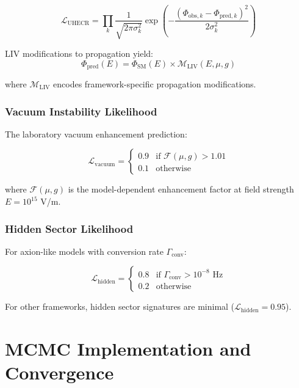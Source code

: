 \documentclass[12pt]{article}
\begin{document}
\begin{equation}
\mathcal{L}_{\text{UHECR}} = \prod_k \frac{1}{\sqrt{2\pi\sigma_k^2}} \exp\left(-\frac{(\Phi_{\text{obs},k} - \Phi_{\text{pred},k})^2}{2\sigma_k^2}\right)
\end{equation}

LIV modifications to propagation yield:
\begin{equation}
\Phi_{\text{pred}}(E) = \Phi_{\text{SM}}(E) \times \mathcal{M}_{\text{LIV}}(E, \mu, g)
\end{equation}

where $\mathcal{M}_{\text{LIV}}$ encodes framework-specific propagation modifications.

\subsubsection{Vacuum Instability Likelihood}

The laboratory vacuum enhancement prediction:

\begin{equation}
\mathcal{L}_{\text{vacuum}} = \begin{cases}
0.9 & \text{if } \mathcal{F}(\mu, g) > 1.01 \\
0.1 & \text{otherwise}
\end{cases}
\end{equation}

where $\mathcal{F}(\mu, g)$ is the model-dependent enhancement factor at field strength $E = 10^{15}$ V/m.

\subsubsection{Hidden Sector Likelihood}

For axion-like models with conversion rate $\Gamma_{\text{conv}}$:

\begin{equation}
\mathcal{L}_{\text{hidden}} = \begin{cases}
0.8 & \text{if } \Gamma_{\text{conv}} > 10^{-8} \text{ Hz} \\
0.2 & \text{otherwise}
\end{cases}
\end{equation}

For other frameworks, hidden sector signatures are minimal ($\mathcal{L}_{\text{hidden}} = 0.95$).

\section{MCMC Implementation and Convergence}
\end{document}
